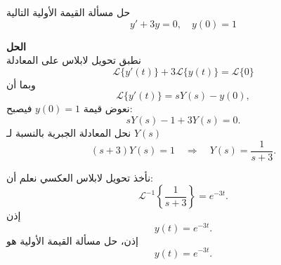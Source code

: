     \begin{example}
    	حل مسألة القيمة الأولية التالية
    	\[
    	y' + 3y = 0,\quad y(0) = 1
    	\]
    \end{example}
 
\noindent
\textbf{الحل}\\
\noindent
    	 نطبق تحويل لابلاس على المعادلة
    	\[
    	\mathcal{L}\{y'(t)\} + 3\mathcal{L}\{y(t)\} = \mathcal{L}\{0\}
    	\]
    	وبما أن
    	\[
    	\mathcal{L}\{y'(t)\} = sY(s) - y(0),
    	\]
    	نعوض قيمة \(y(0)=1\) فيصبح:
    	\[
    	sY(s) - 1 + 3Y(s) = 0.
    	\]
    	نحل المعادلة الجبرية بالنسبة لـ \(Y(s)\)
    	\[
    	(s + 3)Y(s) = 1 \quad \Rightarrow \quad Y(s) = \frac{1}{s+3}.
    	\]
    	
     نأخذ تحويل لابلاس العكسي
    	نعلم أن:
    	\[
    	\mathcal{L}^{-1}\left\{\frac{1}{s+3}\right\} = e^{-3t}.
    	\]
    	إذن
    	\[
    	y(t) = e^{-3t}.
    	\]
    	إذن، حل مسألة القيمة الأولية هو
    	\[
    	y(t) = e^{-3t}.
    	\]
    